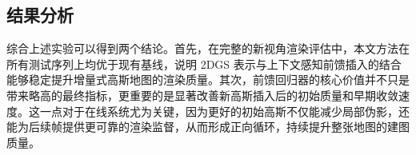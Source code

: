 \subsection{结果分析}

综合上述实验可以得到两个结论。首先，在完整的新视角渲染评估中，本文方法在所有测试序列上均优于现有基线，说明 2DGS 表示与上下文感知前馈插入的结合能够稳定提升增量式高斯地图的渲染质量。其次，前馈回归器的核心价值并不只是带来略高的最终指标，更重要的是显著改善新高斯插入后的初始质量和早期收敛速度。这一点对于在线系统尤为关键，因为更好的初始高斯不仅能减少局部伪影，还能为后续帧提供更可靠的渲染监督，从而形成正向循环，持续提升整张地图的建图质量。
